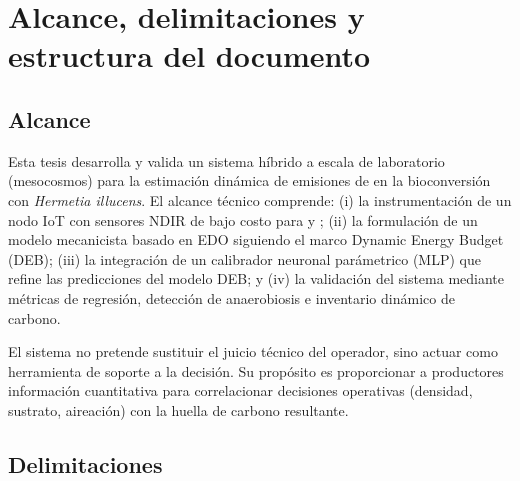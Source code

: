 \section{Alcance, delimitaciones y estructura del documento}

\subsection{Alcance}

Esta tesis desarrolla y valida un sistema híbrido a escala de laboratorio (mesocosmos) para la estimación dinámica de emisiones de  en la bioconversión con \textit{Hermetia illucens}. El alcance técnico comprende: (i) la instrumentación de un nodo IoT con sensores NDIR de bajo costo para  y ; (ii) la formulación de un modelo mecanicista basado en EDO siguiendo el marco Dynamic Energy Budget (DEB); (iii) la integración de un calibrador neuronal parámetrico (MLP) que refine las predicciones del modelo DEB; y (iv) la validación del sistema mediante métricas de regresión, detección de anaerobiosis e inventario dinámico de carbono.

El sistema no pretende sustituir el juicio técnico del operador, sino actuar como herramienta de soporte a la decisión. Su propósito es proporcionar a productores información cuantitativa para correlacionar decisiones operativas (densidad, sustrato, aireación) con la huella de carbono resultante.

\subsection{Delimitaciones}

